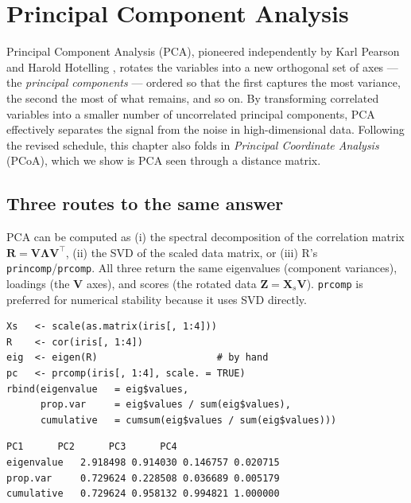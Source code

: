 \documentclass[11pt,oneside]{book}
\newcommand{\code}[1]{\texttt{#1}}
\newcommand{\R}{\textsf{R}}
\begin{document}
\chapter{Principal Component Analysis}
\label{ch:pca}
Principal Component Analysis (PCA), pioneered independently by Karl Pearson \cite{Pearson_1901} and Harold Hotelling \cite{Hotelling_1933}, rotates the variables into a new orthogonal set of axes — the \emph{principal components} — ordered so that the first captures the most variance, the second the most of what remains, and so on. By transforming correlated variables into a smaller number of uncorrelated principal components, PCA effectively separates the signal from the noise in high-dimensional data. Following the revised schedule, this chapter also folds in \emph{Principal Coordinate Analysis} (PCoA), which we show is PCA seen through a distance matrix.

\section{Three routes to the same answer}
PCA can be computed as (i) the spectral decomposition of the correlation matrix
$\mathbf{R}=\mathbf{V}\mathbf{\Lambda}\mathbf{V}^{\!\top}$, (ii) the SVD of the scaled
data matrix, or (iii) \R's \code{princomp}/\code{prcomp}. All three return the same
eigenvalues (component variances), loadings (the $\mathbf{V}$ axes), and scores (the
rotated data $\mathbf{Z}=\mathbf{X}_s\mathbf{V}$). \code{prcomp} is preferred for
numerical stability because it uses SVD directly.

\begin{lstlisting}
Xs   <- scale(as.matrix(iris[, 1:4]))
R    <- cor(iris[, 1:4])
eig  <- eigen(R)                     # by hand
pc   <- prcomp(iris[, 1:4], scale. = TRUE)
rbind(eigenvalue   = eig$values,
      prop.var     = eig$values / sum(eig$values),
      cumulative   = cumsum(eig$values / sum(eig$values)))
\end{lstlisting}

\begin{lstlisting}[style=rout]
                  PC1      PC2      PC3      PC4
eigenvalue   2.918498 0.914030 0.146757 0.020715
prop.var     0.729624 0.228508 0.036689 0.005179
cumulative   0.729624 0.958132 0.994821 1.000000
\end{lstlisting}
\end{document}
